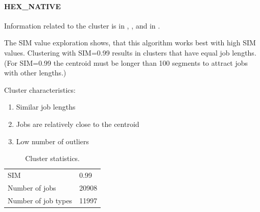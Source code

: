 \documentclass[]{llncs}
\begin{document}
\paragraph{HEX\_NATIVE}
Information related to the cluster is in , , and in .


The SIM value exploration shows, that this algorithm works best with high SIM values.
Clustering with SIM=0.99 results in clusters that have equal job lengths.
(For SIM=0.99 the centroid must be longer than 100 segments to attract jobs with other lengths.) 

Cluster characteristics:

\begin{enumerate}
 \item Similar job lengths
 \item Jobs are relatively close to the centroid
 \item Low number of outliers
\end{enumerate}

\begin{table}
  \centering
  \begin{tabular}{ll}
    SIM & 0.99 \\
    Number of jobs & 20908 \\
    Number of job types & 11997 \\
  \end{tabular}
  \caption{Cluster statistics.}
  \label{tab:hex_native:stats}
\end{table}
\end{document}
